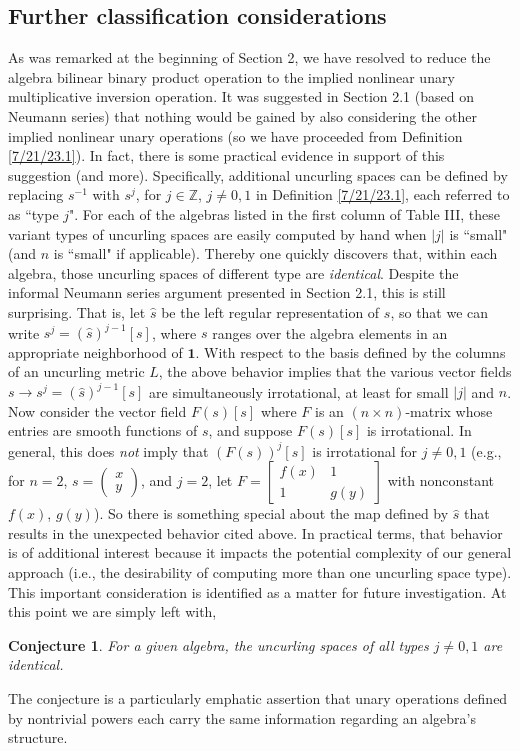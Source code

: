 \documentclass{amsart}
\numberwithin{equation}{section}
\newtheorem*{conjecture}{Conjecture}
\theoremstyle{definition}
\numberwithin{theorem}{section}
\begin{document}
\subsection{Further classification considerations} As was remarked at the beginning of Section 2, we have resolved to reduce the algebra bilinear binary product operation to the implied nonlinear unary multiplicative inversion operation.  It was suggested in Section 2.1 (based on Neumann series) that nothing would be gained by also considering the other implied nonlinear unary operations (so we have proceeded from Definition \ref{7/21/23.1}). In fact, there is some practical evidence in support of this suggestion (and more).  Specifically, additional uncurling spaces can be defined by replacing $s^{-1}$ with $s^j$, for $j\in\mathbb{Z}$, $j\ne 0,1$ in Definition \ref{7/21/23.1}, each referred to as ``type $j$".  For each of the algebras listed in the first column of Table III, these variant types of uncurling spaces are easily computed by hand when  $|j|$ is ``small" (and $n$ is ``small" if applicable).  
Thereby one quickly discovers that, within each algebra, those uncurling spaces of different type are {\it identical}.  Despite the informal Neumann series argument presented in Section 2.1, this is still surprising.  That is, let $\hat{s}$ be the left regular representation of $s$, so that we can write $s^j = (\hat{s})^{j-1}[s]$, where $s$ ranges over the algebra elements in an appropriate neighborhood of $\mathbf{1}$. With respect to the basis defined by the columns of an uncurling metric $L$, the above behavior implies that the various vector fields $s\rightarrow s^j = (\hat{s})^{j-1}[s]$ are simultaneously irrotational, at least for small $|j|$ and $n$.  Now consider the vector field $F(s)[s]$ where $F$ is an \mbox{$(n\times n)$-matrix} whose entries are smooth functions of $s$, and suppose $F(s)[s]$ is \mbox{irrotational}.  In general, this does {\it not} imply that $(F(s))^j[s]$ is irrotational for $j\ne 0,1$ (e.g., for \mbox{$n=2$}, $s=\left(\begin{array}{ccc}
 x   \\ 
y    
\end{array}\right)$, and $j=2$, let $F= \left[\begin{array}{ccc}
 f(x) & 1   \\ 
 1 & g(y)    
\end{array}\right]$ with nonconstant $f(x)$, $g(y)$).  So there is something special about the map defined by $\hat{s}$ that results in the unexpected behavior cited above. 
In practical terms, that behavior is of additional interest because it impacts the potential complexity of our general approach (i.e., the desirability of computing more than one uncurling space type).  This important consideration is identified as a matter for future investigation. At this point we are simply left with,
\begin{conjecture} For a given algebra, the uncurling spaces of all types $j\ne 0,1$ are identical. 
\end{conjecture}
\noindent The conjecture is a particularly emphatic assertion that unary operations defined by nontrivial powers each carry the same information regarding an algebra's structure. 
\end{document}
